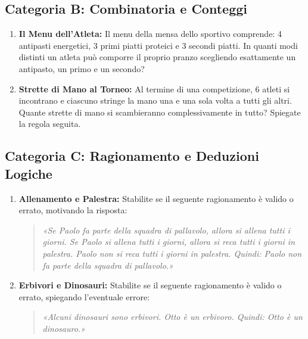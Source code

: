 \documentclass[11pt, a4paper]{article}
\begin{document}
\subsection*{Categoria B: Combinatoria e Conteggi}
\begin{enumerate}[resume]
    \item \textbf{Il Menu dell'Atleta:} Il menu della mensa dello sportivo comprende: 4 antipasti energetici, 3 primi piatti proteici e 3 secondi piatti. In quanti modi distinti un atleta può comporre il proprio pranzo scegliendo esattamente un antipasto, un primo e un secondo?
    
    \vspace{1cm}

    \item \textbf{Strette di Mano al Torneo:} Al termine di una competizione, 6 atleti si incontrano e ciascuno stringe la mano una e una sola volta a tutti gli altri. Quante strette di mano si scambieranno complessivamente in tutto? Spiegate la regola seguita.
    
    \vspace{1cm}
\end{enumerate}

\subsection*{Categoria C: Ragionamento e Deduzioni Logiche}
\begin{enumerate}[resume]
    \item \textbf{Allenamento e Palestra:} Stabilite se il seguente ragionamento è valido o errato, motivando la risposta:
    \begin{quote}
    \textit{«Se Paolo fa parte della squadra di pallavolo, allora si allena tutti i giorni. Se Paolo si allena tutti i giorni, allora si reca tutti i giorni in palestra. Paolo non si reca tutti i giorni in palestra. Quindi: Paolo non fa parte della squadra di pallavolo.»}
    \end{quote}
    
    \vspace{1cm}

    \item \textbf{Erbivori e Dinosauri:} Stabilite se il seguente ragionamento è valido o errato, spiegando l'eventuale errore:
    \begin{quote}
    \textit{«Alcuni dinosauri sono erbivori. Otto è un erbivoro. Quindi: Otto è un dinosauro.»}
    \end{quote}
    
    \vspace{1cm}
\end{enumerate}
\end{document}
